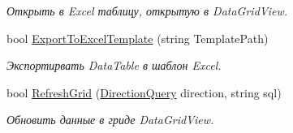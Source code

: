 \begin{DoxyCompactItemize}
\begin{DoxyCompactList}\small\item\em Открыть в Excel таблицу, открытую в Data\+Grid\+View. \end{DoxyCompactList}\item 
bool \mbox{\hyperlink{class_f_b_a_1_1_data_grid_view_f_b_a_a4fa4c76ee8e291f78141ae2ce627445b}{Export\+To\+Excel\+Template}} (string Template\+Path)
\begin{DoxyCompactList}\small\item\em Экспортирвать Data\+Table в шаблон Excel. \end{DoxyCompactList}\item 
bool \mbox{\hyperlink{class_f_b_a_1_1_data_grid_view_f_b_a_a15f0d44e7a2aa8101ac8f21803244c86}{Refresh\+Grid}} (\mbox{\hyperlink{namespace_f_b_a_a6ff7d5c242d98046d1980715b06d7300}{Direction\+Query}} direction, string sql)
\begin{DoxyCompactList}\small\item\em Обновить данные в гриде Data\+Grid\+View. \end{DoxyCompactList}\end{DoxyCompactItemize}
